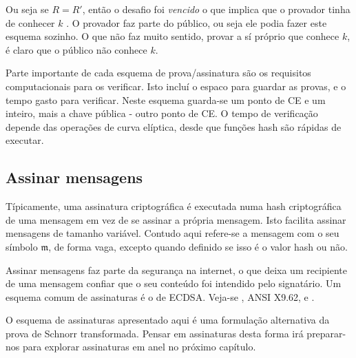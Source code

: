 \begin{enumerate}
Ou seja se $R = R'$, então o desafio foi {\em vencido} o que implica que o provador tinha de conhecer $k$ . O provador faz parte do público, ou seja ele podia fazer este esquema sozinho. O que não faz muito sentido, provar a sí próprio que conhece $k$, é claro que o público não conhece $k$.

Parte importante de cada esquema de prova/assinatura são os requisitos computacionais para os verificar. Isto incluí o espaco para guardar as provas, e o tempo gasto para verificar. Neste esquema guarda-se um ponto de CE e um inteiro, mais a chave pública - outro ponto de CE. O tempo de verificação depende das operações de curva elíptica, desde que funções hash são rápidas de executar.   


\subsection{Assinar mensagens}
\label{sec:signing-messages}

Típicamente, uma assinatura criptográfica é executada numa hash criptográfica de uma mensagem em vez de se assinar a própria mensagem. Isto facilita assinar mensagens de tamanho variável. Contudo aqui refere-se a mensagem com o seu símbolo $\mathfrak{m}$, de forma vaga, excepto quando definido se isso é o valor hash ou não.

Assinar mensagens faz parte da segurança na internet, o que deixa um recipiente de uma mensagem confiar que o seu conteúdo foi intendido pelo signatário. Um esquema comum de assinaturas é o de ECDSA. Veja-se \cite{ecdsa}, ANSI X9.62, e \cite{Hankerson:2003:GEC:940321}.  


O esquema de assinaturas apresentado aqui é uma formulação alternativa da prova de Schnorr transformada. Pensar em assinaturas desta forma irá preparar-nos para explorar assinaturas em anel no próximo capítulo.   


\end{enumerate}
